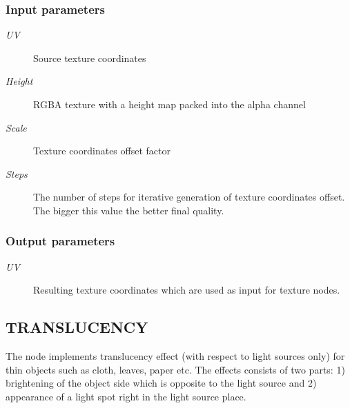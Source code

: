 \documentclass[a4paper,12pt,oneside]{sphinxmanual}
\begin{document}
\subsubsection{Input parameters}
\label{node_materials:id4}\begin{description}
\item[{\emph{UV}}] \leavevmode
Source texture coordinates

\item[{\emph{Height}}] \leavevmode
RGBA texture with a height map packed into the alpha channel

\item[{\emph{Scale}}] \leavevmode
Texture coordinates offset factor

\item[{\emph{Steps}}] \leavevmode
The number of steps for iterative generation of texture coordinates offset. The bigger this value the better final quality.

\end{description}


\subsubsection{Output parameters}
\label{node_materials:id5}\begin{description}
\item[{\emph{UV}}] \leavevmode
Resulting texture coordinates which are used as input for texture nodes.

\end{description}


\subsection{TRANSLUCENCY}
\label{node_materials:translucency}
The node implements translucency effect (with respect to light sources only) for thin objects such as cloth, leaves, paper etc. The effects consists of two parts: 1) brightening of the object side which is opposite to the light source and 2) appearance of a light spot right in the light source place.
\end{document}
